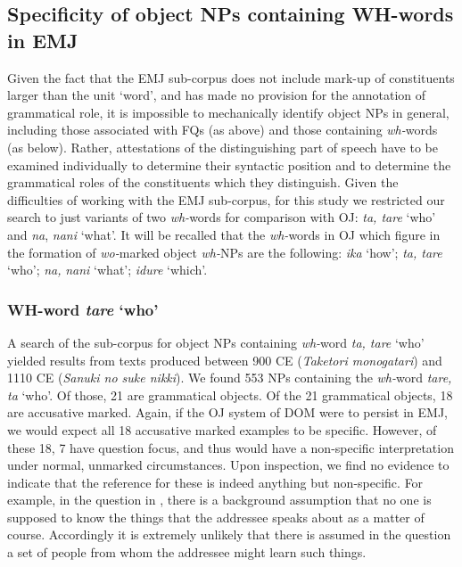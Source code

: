 \documentclass[output=paper]{LSP/langsci}
\begin{document}
\subsection{Specificity of object NPs containing WH-words in EMJ}
\label{07-fr-sec:3-2}

Given the fact that the EMJ sub-corpus does not include mark-up of constituents larger than the unit ‘word’, and has made no provision for the annotation of grammatical role, it is impossible to mechanically identify object NPs in general, including those associated with FQs (as above) and those containing \textit{wh-}words (as below). Rather, attestations of the distinguishing part of speech have to be examined individually to determine their syntactic position and to determine the grammatical roles of the constituents which they distinguish. Given the difficulties of working with the EMJ sub-corpus, for this study we restricted our search to just variants of two \textit{wh-}words for comparison with OJ: \textit{ta, tare} ‘who’ and \textit{na}, \textit{nani} ‘what’. It will be recalled that the \textit{wh-}words in OJ   which figure in the formation of \textit{wo-}marked object \textit{wh-}NPs are the following: \textit{ika} ‘how’; \textit{ta, tare} ‘who’; \textit{na,} \textit{nani} ‘what’; \textit{idure} ‘which’. 

\subsubsection{WH-word \textit{tare} ‘who’}
\label{07-subsubsec:3-2-1}

A search of the sub-corpus for object NPs containing \textit{wh-}word \textit{ta, tare} ‘who’ yielded results from texts produced between 900 CE (\textit{Taketori monogatari}) and 1110 CE (\textit{Sanuki no suke nikki}). We found 553 NPs containing the \textit{wh-}word \textit{tare, ta} ‘who’. Of those, 21 are grammatical objects. Of the 21 grammatical objects, 18 are accusative marked. Again, if the OJ   system of DOM were to persist in EMJ, we would expect all 18 accusative marked examples to be specific. However, of these 18, 7 have question focus, and thus would have a non-specific interpretation under normal, unmarked circumstances. Upon inspection, we find no evidence to indicate that the reference for these is indeed anything but non-specific. For example, in the question in , there is a background assumption that no one is supposed to know the things that the addressee speaks about as a matter of course. Accordingly it is extremely unlikely that there is assumed in the question a  set of people from whom the addressee might learn such things. 
\end{document}
